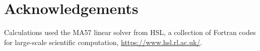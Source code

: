 \section*{Acknowledgements}
Calculations used the MA57 linear solver from HSL, a collection of Fortran codes for large-scale scientific computation, \url{https://www.hsl.rl.ac.uk/}.
